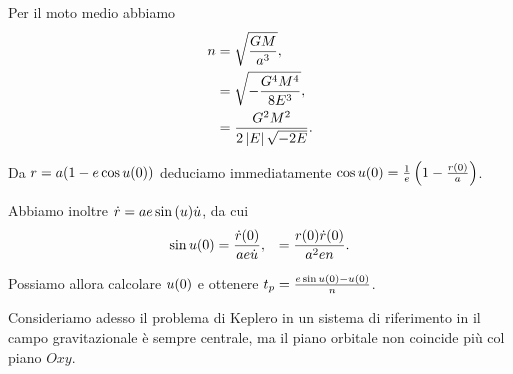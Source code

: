 \Proof Per il moto medio abbiamo
\begin{align*}
  n
  &= \sqrt{\frac{GM}{a^3}},\\
  &= \sqrt
    {- \frac{G^4M^4}{8 E^3}},\\
  &= \frac{G^2M^2}
    {2 \left \lvert E \right \rvert\sqrt{- 2 E}}.
\end{align*}
\par Da $r = a(1 - e \cos{u(0)})$
deduciamo immediatamente
$\cos{u(0)} = \frac{1}{e}
\left ( 1 - \frac{r(0)}{a} \right )$.
\par Abbiamo inoltre
 $\dot{r}
= a e \sin{(u)}
\dot{u}$, da cui
\begin{align*}
  \sin{u(0)}
  &=\frac{\dot{r}(0)}{ae\dot{u}},
  &=\frac{r(0) \dot{r}(0)}{a^2en}.
\end{align*}
\par Possiamo allora calcolare $u(0)$ e ottenere
${t_p}
= \frac{e \sin{u(0)} - u(0)}
{n}$. \EndProof
\par Consideriamo adesso il problema di Keplero in un sistema di
riferimento in il campo gravitazionale \`e sempre centrale, ma il piano
orbitale non coincide pi\`u col piano $Oxy$.

